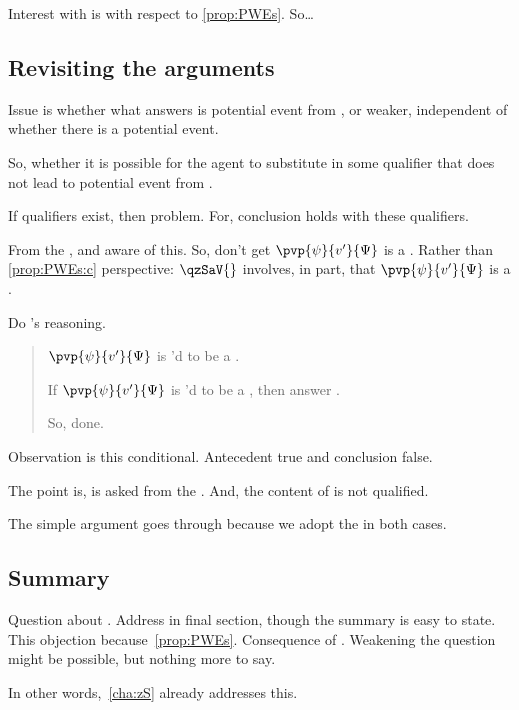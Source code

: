 \begin{note}
  Interest with \ptivity{} is with respect to \autoref{prop:PWEs}.
  So\dots
\end{note}

\subsection{Revisiting the arguments}
\label{cha:zSpA:sec:revisiting-arguments}

\begin{note}
  Issue is whether what answers \qzS{} is potential event from \agpe{}, or  weaker, independent of whether there is a potential event.

  So, whether it is possible for the agent to substitute in some qualifier that does not lead to potential event from \agpe{}.

  If qualifiers exist, then problem.
  For, conclusion holds with these qualifiers.

  From the \agpe{}, and aware of this.
  So, don't get \(\pvp{\psi}{v'}{\Psi}\) is a \fc{}.
  Rather than \ref{prop:PWEs:c} perspective:
  {
    \color{red}
    \(\qzSaV{}\) involves, in part,  that \(\pvp{\psi}{v'}{\Psi}\) is a \fc{}.
  }

  Do \citeauthor{Hyman:1999tm}'s reasoning.
  \begin{quote}
    \(\pvp{\psi}{v'}{\Psi}\) is \ptivityQV{}'d to be a \fc{}.

    If \(\pvp{\psi}{v'}{\Psi}\) is \ptivityQV{}'d to be a \fc{}, then answer \qzS{}.

    So, done.
  \end{quote}
  Observation is this conditional.
  Antecedent true and conclusion false.
\end{note}

\begin{note}
  The point is, \qzS{} is asked from the \agpe{}.
  And, the content of \qzS{} is not qualified.

  The simple argument goes through because we adopt the \agpe{} in both cases.
\end{note}

\subsection{Summary}
\label{sec:summary}

\begin{note}
  Question about \qzS{}.
  Address in final section, though the summary is easy to state.
  This objection because~\autoref{prop:PWEs}.
  Consequence of \qzS{}.
  Weakening the question might be possible, but nothing more to say.

  In other words,~\autoref{cha:zS} already addresses this.
\end{note}

